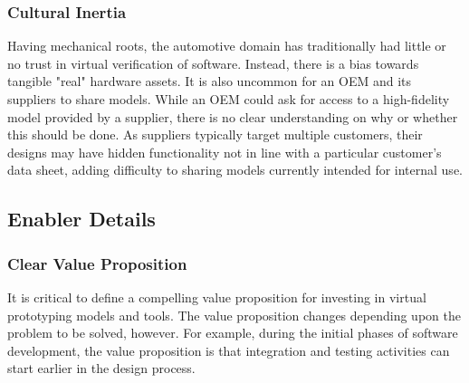 \subsubsection*{Cultural Inertia}
Having mechanical roots, the automotive domain has traditionally had little or no trust in virtual verification of software.
Instead, there is a bias towards tangible "real" hardware assets.
It is also uncommon for an OEM and its suppliers to share models.
While an OEM could ask for access to a high-fidelity model provided by a supplier, there is no clear understanding on why or whether this should be done.
As suppliers typically target multiple customers, their designs may have hidden functionality not in line with a particular customer’s data sheet,
adding difficulty to sharing models currently intended for internal use.



\subsection{Enabler Details}
\subsubsection*{Clear Value Proposition}
It is critical to define a compelling value proposition for investing in virtual prototyping models and tools.
The value proposition changes depending upon the problem to be solved, however.
For example, during the initial phases of software development,
the value proposition is that
integration and testing activities can start earlier in the design process.

